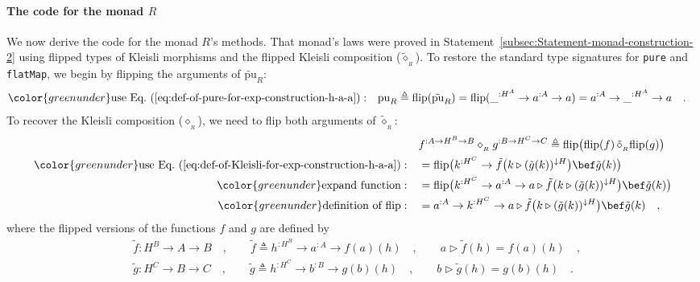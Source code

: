 \paragraph{The code for the monad $R$}

We now derive the code for the monad $R$\textsf{'}s methods. That monad\textsf{'}s
laws were proved in Statement~\ref{subsec:Statement-monad-construction-2}
using flipped types of Kleisli morphisms and the flipped Kleisli composition
($\tilde{\diamond}_{_{R}}$). To restore the standard type signatures
for \lstinline!pure! and \lstinline!flatMap!, we begin by flipping
the arguments of $\tilde{\text{pu}}_{R}$:
\begin{align*}
{\color{greenunder}\text{use Eq.~(\ref{eq:def-of-pure-for-exp-construction-h-a-a})}:}\quad & \text{pu}_{R}\triangleq\text{flip}(\tilde{\text{pu}}_{R})=\text{flip}(\_^{:H^{A}}\rightarrow a^{:A}\rightarrow a)=a^{:A}\rightarrow\_^{:H^{A}}\rightarrow a\quad.
\end{align*}
To recover the Kleisli composition ($\diamond_{_{R}}$), we need to
flip both arguments of $\tilde{\diamond}_{_{R}}$:
\begin{align*}
 & f^{:A\rightarrow H^{B}\rightarrow B}\diamond_{_{R}}g^{:B\rightarrow H^{C}\rightarrow C}\triangleq\text{flip}\big(\text{flip}(f)\,\tilde{\diamond}_{_{R}}\text{flip}(g)\big)\\
{\color{greenunder}\text{use Eq.~(\ref{eq:def-of-Kleisli-for-exp-construction-h-a-a})}:}\quad & =\text{flip}\big(k^{:H^{C}}\rightarrow\tilde{f}\big(k\triangleright(\tilde{g}(k))^{\downarrow H}\big)\bef\tilde{g}(k)\big)\\
{\color{greenunder}\text{expand function}:}\quad & =\text{flip}\big(k^{:H^{C}}\rightarrow a^{:A}\rightarrow a\triangleright\tilde{f}\big(k\triangleright(\tilde{g}(k))^{\downarrow H}\big)\bef\tilde{g}(k)\big)\\
{\color{greenunder}\text{definition of }\text{flip}:}\quad & =a^{:A}\rightarrow k^{:H^{C}}\rightarrow a\triangleright\tilde{f}\big(k\triangleright(\tilde{g}(k))^{\downarrow H}\big)\bef\tilde{g}(k)\quad,
\end{align*}
where the flipped versions of the functions $f$ and $g$ are defined
by
\begin{align*}
 & \tilde{f}:H^{B}\rightarrow A\rightarrow B\quad,\quad\quad\tilde{f}\triangleq h^{:H^{B}}\rightarrow a^{:A}\rightarrow f(a)(h)\quad,\quad\quad a\triangleright\tilde{f}(h)=f(a)(h)\quad,\\
 & \tilde{g}:H^{C}\rightarrow B\rightarrow C\quad,\quad\quad\tilde{g}\triangleq h^{:H^{C}}\rightarrow b^{:B}\rightarrow g(b)(h)\quad,\quad\quad b\triangleright\tilde{g}(h)=g(b)(h)\quad.
\end{align*}
